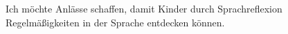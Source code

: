 Ich möchte Anlässe schaffen, damit Kinder durch Sprachreflexion Regelmäßigkeiten in der Sprache entdecken können.